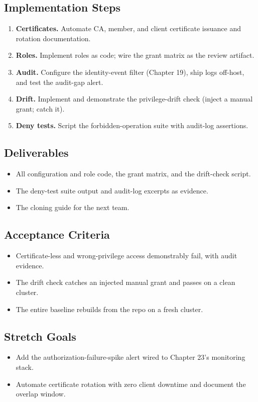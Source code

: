 \subsection*{Implementation Steps}
\begin{enumerate}
    \item \textbf{Certificates.} Automate CA, member, and client certificate issuance and rotation documentation.
    \item \textbf{Roles.} Implement roles as code; wire the grant matrix as the review artifact.
    \item \textbf{Audit.} Configure the identity-event filter (Chapter 19), ship logs off-host, and test the audit-gap alert.
    \item \textbf{Drift.} Implement and demonstrate the privilege-drift check (inject a manual grant; catch it).
    \item \textbf{Deny tests.} Script the forbidden-operation suite with audit-log assertions.
\end{enumerate}

\subsection*{Deliverables}
\begin{itemize}
    \item All configuration and role code, the grant matrix, and the drift-check script.
    \item The deny-test suite output and audit-log excerpts as evidence.
    \item The cloning guide for the next team.
\end{itemize}

\subsection*{Acceptance Criteria}
\begin{itemize}
    \item Certificate-less and wrong-privilege access demonstrably fail, with audit evidence.
    \item The drift check catches an injected manual grant and passes on a clean cluster.
    \item The entire baseline rebuilds from the repo on a fresh cluster.
\end{itemize}

\subsection*{Stretch Goals}
\begin{itemize}
    \item Add the authorization-failure-spike alert wired to Chapter 23's monitoring stack.
    \item Automate certificate rotation with zero client downtime and document the overlap window.
\end{itemize}